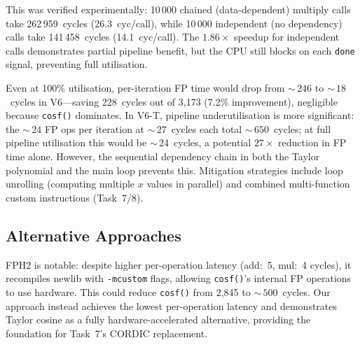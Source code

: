 \documentclass[a4paper,10pt,twocolumn]{article}
\begin{document}
This was verified experimentally: 10\,000 chained (data-dependent) multiply calls take 262\,959~cycles (26.3~cyc/call), while 10\,000 independent (no dependency) calls take 141\,458~cycles (14.1~cyc/call).
The $1.86\times$ speedup for independent calls demonstrates partial pipeline benefit, but the CPU still blocks on each \texttt{done} signal, preventing full utilisation.

Even at 100\% utilisation, per-iteration FP time would drop from ${\sim}\,246$ to ${\sim}\,18$~cycles in V6---saving 228~cycles out of 3{,}173 (7.2\% improvement), negligible because \texttt{cosf()} dominates.
In V6-T, pipeline underutilisation is more significant: the ${\sim}\,24$ FP ops per iteration at ${\sim}\,27$~cycles each total ${\sim}\,650$~cycles; at full pipeline utilisation this would be ${\sim}\,24$~cycles, a potential $27\times$ reduction in FP time alone.
However, the sequential dependency chain in both the Taylor polynomial and the main loop prevents this.
Mitigation strategies include loop unrolling (computing multiple $x$ values in parallel) and combined multi-function custom instructions (Task~7/8).

\subsection{Alternative Approaches}

\begin{table}[H]
\centering
\caption{Custom instruction implementation trade-offs.}
\label{tab:t6_approaches}
\footnotesize
{}
\end{table}

FPH2 is notable: despite higher per-operation latency (add:~5, mul:~4 cycles), it recompiles newlib with \texttt{-mcustom} flags, allowing \texttt{cosf()}'s internal FP operations to use hardware.
This could reduce \texttt{cosf()} from 2{,}845 to ${\sim}\,500$~cycles.
Our approach instead achieves the lowest per-operation latency and demonstrates Taylor cosine as a fully hardware-accelerated alternative, providing the foundation for Task~7's CORDIC replacement.
\end{document}
